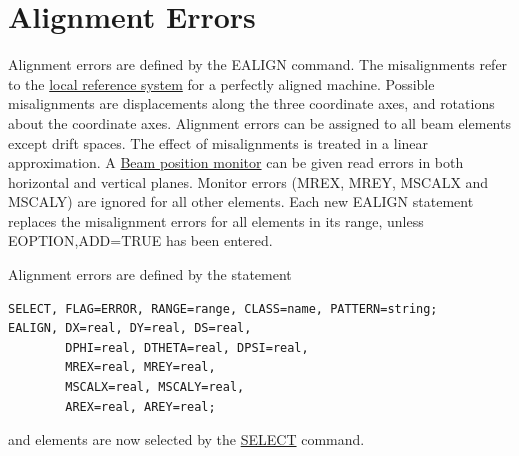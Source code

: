 
\section{Alignment Errors} %
\label{sec:error_align}
Alignment errors are defined by the EALIGN command. The misalignments
refer to the \href{../Introduction/local_system.html}{local reference
  system} for a perfectly aligned machine. Possible misalignments are
displacements along the three coordinate axes, and rotations about the
coordinate axes. Alignment errors can be assigned to all beam elements
except drift spaces. The effect of misalignments is treated in a linear
approximation. A \href{read HREF=../Introduction/monitors.html}{Beam
  position monitor} can be given read errors in both horizontal and
vertical planes. Monitor errors (MREX, MREY, MSCALX and MSCALY) are
ignored for all other elements. Each new EALIGN statement replaces the
misalignment errors for all elements in its range, unless
EOPTION,ADD=TRUE has been entered.  

Alignment errors are defined by the statement 

\begin{verbatim}
SELECT, FLAG=ERROR, RANGE=range, CLASS=name, PATTERN=string;
EALIGN, DX=real, DY=real, DS=real, 
        DPHI=real, DTHETA=real, DPSI=real, 
        MREX=real, MREY=real,
        MSCALX=real, MSCALY=real,
        AREX=real, AREY=real;
\end{verbatim}
and elements are now selected by the
\href{../Introduction/select.html}{SELECT} command. 

